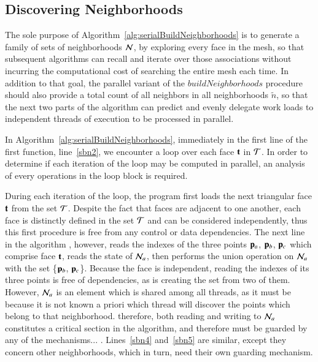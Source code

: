 \subsection{Discovering Neighborhoods}
\label{ch5sPAssDN}
The sole purpose of Algorithm~\ref{alg:serialBuildNeighborhoods} is to generate a family of sets of neighborhoods $\mathcal{N}$, by exploring every face in the mesh, so that subsequent algorithms can recall and iterate over those associations without incurring the computational cost of searching the entire mesh each time. In addition to that goal, the parallel variant of the $\mathit{buildNeighborhoods}$ procedure should also provide a total count of all neighbors in all neighborhoods $\tilde{n}$, so that the next two parts of the  algorithm can predict and evenly delegate work loads to independent threads of execution to be processed in parallel.

In Algorithm~\ref{alg:serialBuildNeighborhoods}, immediately in the first line of the first function, line~\ref{sbn2}, we encounter a loop over each face $\mathbf{t}$ in $\mathcal{T}$. In order to determine if each iteration of the loop may be computed in parallel, an analysis of every operations in the loop block is required.

During each iteration of the loop, the program first loads the next triangular face $\mathbf{t}$ from the set $\mathcal{T}$. Despite the fact that faces are adjacent to one another, each face is distinctly defined in the set $\mathcal{T}$ and can be considered independently, thus this first procedure is free from any control or data dependencies. The next line in the algorithm , however, reads the indexes of the three points $\mathbf{p}_a$, $\mathbf{p}_b$, $\mathbf{p}_c$ which comprise face $\mathbf{t}$, reads the state of $\mathcal{N}_a$, then performs the union operation on $\mathcal{N}_a$ with the set \{$\mathbf{p}_b$, $\mathbf{p}_c$\}. Because the face is independent, reading the indexes of its three points is free of dependencies, as is creating the set from two of them. However, $\mathcal{N}_a$ is an element which is shared among all threads, as it must be because it is not known a priori which thread will discover the points which belong to that neighborhood. therefore, both reading and writing to $\mathcal{N}_a$ constitutes a critical section in the algorithm, and therefore must be guarded by any of the mechanisms... . Lines~\ref{sbn4} and~\ref{sbn5} are similar, except they concern other neighborhoods, which in turn, need their own guarding mechanism.

